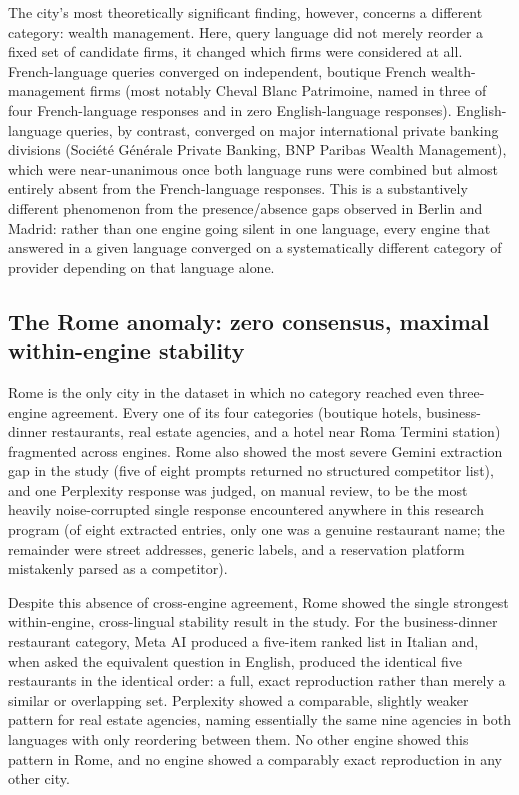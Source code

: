 \documentclass[11pt]{article}
\begin{document}
The city's most theoretically significant finding, however, concerns a different
category: wealth management. Here, query language did not merely reorder a fixed set of
candidate firms, it changed which firms were considered at all. French-language queries
converged on independent, boutique French wealth-management firms (most notably Cheval
Blanc Patrimoine, named in three of four French-language responses and in zero
English-language responses). English-language queries, by contrast, converged on major
international private banking divisions (Soci\'et\'e G\'en\'erale Private Banking, BNP
Paribas Wealth Management), which were near-unanimous once both language runs were
combined but almost entirely absent from the French-language responses. This is a
substantively different phenomenon from the presence/absence gaps observed in Berlin
and Madrid: rather than one engine going silent in one language, every engine that
answered in a given language converged on a systematically different category of
provider depending on that language alone.

\subsection{The Rome anomaly: zero consensus, maximal within-engine stability}

Rome is the only city in the dataset in which no category reached even three-engine
agreement. Every one of its four categories (boutique hotels, business-dinner
restaurants, real estate agencies, and a hotel near Roma Termini station) fragmented
across engines. Rome also showed the most severe Gemini extraction gap in the study
(five of eight prompts returned no structured competitor list), and one Perplexity
response was judged, on manual review, to be the most heavily noise-corrupted single
response encountered anywhere in this research program (of eight extracted entries,
only one was a genuine restaurant name; the remainder were street addresses, generic
labels, and a reservation platform mistakenly parsed as a competitor).

Despite this absence of cross-engine agreement, Rome showed the single strongest
within-engine, cross-lingual stability result in the study. For the business-dinner
restaurant category, Meta AI produced a five-item ranked list in Italian and, when asked
the equivalent question in English, produced the identical five restaurants in the
identical order: a full, exact reproduction rather than merely a similar or overlapping
set. Perplexity showed a comparable, slightly weaker pattern for real estate agencies,
naming essentially the same nine agencies in both languages with only reordering
between them. No other engine showed this pattern in Rome, and no engine showed a
comparably exact reproduction in any other city.
\end{document}
